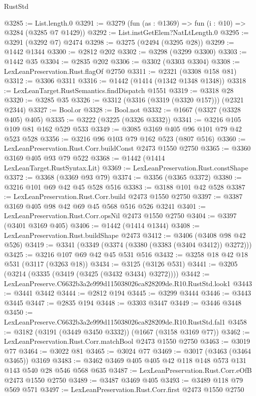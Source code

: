 \begin{lexlean}{RustStd}
\begin{coremodule}
@3285 := List.length.{0}
@3291 := @3279 (fun (as : @1369) => fun (i : @10) => @3284 (@3285 @7 @1429))
@3292 := List.instGetElem?NatLtLength.{0}
@3295 := @3291 (@3292 @7) @2474
@3298 := @3275 (@2494 (@3295 @28))
@3299 := @1442 @1344
@3300 := @2812 @202
@3302 := @3298 (@3299 @3300)
@3303 := @1442 @35
@3304 := @2835 @202
@3306 := @3302 (@3303 @3304)
@3308 := LexLeanPreservation.Rust.flagOf @2750
@3311 := @2321 (@3308 @158 @81)
@3312 := @3306 @3311
@3316 := @1442 (@1414 (@1342 @1348 @1348))
@3318 := LexLeanTarget.RustSemantics.findDispatch @1551
@3319 := @3318 @28
@3320 := @3285 @35
@3326 := @3312 (@3316 (@3319 (@3320 @157))) (@2321 @2344)
@3327 := Bool.or
@3328 := Bool.not
@3332 := @1667 (@3327 (@3328 @405) @405)
@3335 := @3222 (@3225 (@3326 @3332))
@3341 := @3216 @105 @109 @81 @162 @529 @533
@3349 := @3085 @3169 @405 @96 @101 @79 @42 @523 @528
@3356 := @3216 @96 @103 @79 @162 @523 (@807 @516)
@3360 := LexLeanPreservation.Rust.Corr.buildConst @2473 @1550 @2750
@3365 := @3360 @3169 @405 @93 @79 @522
@3368 := @1442 (@1414 LexLeanTarget.RustSyntax.Lit)
@3369 := LexLeanPreservation.Rust.constShape
@3372 := @3368 (@3369 @93 @79)
@3374 := @3356 (@3365 @3372)
@3380 := @3216 @101 @69 @42 @45 @528 @516
@3383 := @3188 @101 @42 @528
@3387 := LexLeanPreservation.Rust.Corr.build @2473 @1550 @2750
@3397 := @3387 @3169 @405 @98 @42 @69 @45 @568 @516 @526 @3241
@3401 := LexLeanPreservation.Rust.Corr.opsNil @2473 @1550 @2750
@3404 := @3397 (@3401 @3169 @405)
@3406 := @1442 (@1414 @1344)
@3408 := LexLeanPreservation.Rust.buildShape @2473
@3412 := @3406 (@3408 @98 @42 @526)
@3419 := @3341 (@3349 (@3374 (@3380 (@3383 (@3404 @3412)) @3272)))
@3425 := @3216 @107 @69 @42 @45 @531 @516
@3432 := @3258 @18 @42 @18 @531 (@3117 (@3263 @18))
@3434 := @3125 (@3126 @531)
@3441 := @3205 (@3214 (@3335 (@3419 (@3425 (@3432 @3434) @3272))))
@3442 := LexLeanPreserve.C6632b3a2e999d115038026ca828209de.R10.RustStd.look1
@3443 := @3441 @3442
@3444 := @2812 @194
@3445 := @3299 @3444
@3446 := @3443 @3445
@3447 := @2835 @194
@3448 := @3303 @3447
@3449 := @3446 @3448
@3450 := LexLeanPreserve.C6632b3a2e999d115038026ca828209de.R10.RustStd.fal1
@3458 := @3182 (@3191 (@3449 @3450 @3332)) (@1667 (@3158 @3169 @77))
@3462 := LexLeanPreservation.Rust.Corr.matchBool @2473 @1550 @2750
@3463 := @3019 @77
@3464 := @3022 @81
@3465 := @3024 @77
@3469 := @3017 (@3463 (@3464 @3465)) @3169
@3483 := @3462 @3469 @405 @405 @42 @118 @148 @573 @131 @143 @540 @28 @546 @568 @635
@3487 := LexLeanPreservation.Rust.Corr.eOfB @2473 @1550 @2750
@3489 := @3487 @3469 @405
@3493 := @3489 @118 @79 @569 @571
@3497 := LexLeanPreservation.Rust.Corr.first @2473 @1550 @2750

\end{coremodule}
\end{lexlean}
